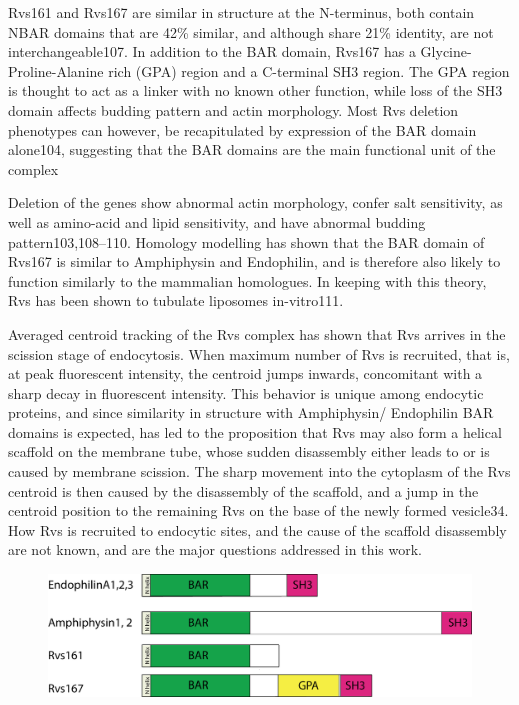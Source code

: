 		
	\vspace{5mm}
	Rvs161 and Rvs167 are similar in structure at the N-terminus, both contain NBAR domains that are 42\% similar, and although share 21\% identity, are not interchangeable107. In addition to the BAR domain, Rvs167 has a Glycine-Proline-Alanine rich (GPA) region and a C-terminal SH3 region. The GPA region is thought to act as a linker with no known other function, while loss of the SH3 domain affects budding pattern and actin morphology. Most Rvs deletion phenotypes can however, be recapitulated by expression of the BAR domain alone104, suggesting that the BAR domains are the main functional unit of the complex 

	\vspace{5mm}
	Deletion of the genes show abnormal actin morphology, confer salt sensitivity, as well as amino-acid and lipid sensitivity, and have abnormal budding pattern103,108–110. Homology modelling has shown that the BAR domain of Rvs167 is similar to Amphiphysin and Endophilin, and is therefore also likely to function similarly to the mammalian homologues. In keeping with this theory, Rvs has been shown to tubulate liposomes in-vitro111. 

		
	\vspace{5mm}
	Averaged centroid tracking of the Rvs complex has shown that Rvs arrives in the scission stage of endocytosis. When maximum number of Rvs is recruited, that is, at peak fluorescent intensity, the centroid jumps inwards, concomitant with a sharp decay in fluorescent intensity. This behavior is unique among endocytic proteins, and since similarity in structure with Amphiphysin/ Endophilin BAR domains is expected, has led to the proposition that Rvs may also form a helical scaffold on the membrane tube, whose sudden disassembly either leads to or is caused by membrane scission. The sharp movement into the cytoplasm of the Rvs centroid is then caused by the disassembly of the scaffold, and a jump in the centroid position to the remaining Rvs on the base of the newly formed vesicle34. How Rvs is recruited to endocytic sites, and the cause of the scaffold disassembly are not known, and are the major questions addressed in this work.

\begin{figure}[H]
	\centering
	\includegraphics[scale=0.4]{figures/intro/BARdomainstruc2}
\end{figure}
		

